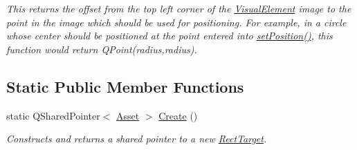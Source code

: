 \begin{DoxyCompactItemize}
\begin{DoxyCompactList}\small\item\em This returns the offset from the top left corner of the \hyperlink{struct_picto_1_1_visual_element}{Visual\-Element} image to the point in the image which should be used for positioning. For example, in a circle whose center should be positioned at the point entered into \hyperlink{struct_picto_1_1_visual_element_a454cc96862097e96a0b0f1d2c83e23ed}{set\-Position()}, this function would return Q\-Point(radius,radius). \end{DoxyCompactList}\end{DoxyCompactItemize}
\subsection*{Static Public Member Functions}
\begin{DoxyCompactItemize}
\item 
\hypertarget{class_picto_1_1_rect_target_aee225b6a22440bfcecf95022eefb4b32}{static Q\-Shared\-Pointer$<$ \hyperlink{class_picto_1_1_asset}{Asset} $>$ \hyperlink{class_picto_1_1_rect_target_aee225b6a22440bfcecf95022eefb4b32}{Create} ()}\label{class_picto_1_1_rect_target_aee225b6a22440bfcecf95022eefb4b32}

\begin{DoxyCompactList}\small\item\em Constructs and returns a shared pointer to a new \hyperlink{class_picto_1_1_rect_target}{Rect\-Target}. \end{DoxyCompactList}\end{DoxyCompactItemize}
